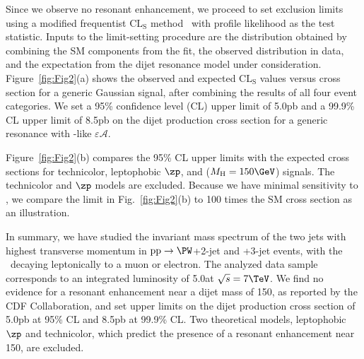 Since we observe no resonant enhancement, we proceed to set exclusion
limits using a modified frequentist $\text{CL}_{\text{S}}$
method~\cite{CLS,Junk:1999kv} with profile likelihood as the test
statistic.  Inputs to the limit-setting procedure are the \mjj
distribution obtained by combining the SM components from the fit, the
observed distribution in data, and the expectation from the dijet
resonance model under consideration.  Figure~\ref{fig:Fig2}(a) shows
the observed and expected $\text{CL}_{\text{S}}$ values versus cross
section for a generic Gaussian signal, after combining the results of
all four event categories.  We set a 95\% confidence level (CL) upper
limit of 5.0\unit{pb} and a 99.9\% CL upper limit of 8.5\unit{pb} on
the dijet production cross section for a generic resonance with
\PW\PH-like $\varepsilon\mathcal{A}$.

Figure~\ref{fig:Fig2}(b) compares the 95\% CL upper limits with the
expected cross sections for technicolor, leptophobic $\zp$, and \PW\PH
($M_{\text{H}} = 150\GeV$) signals.  The technicolor and $\zp$ models
are excluded. Because we have minimal sensitivity to \PW\PH, we compare
the limit in Fig.~\ref{fig:Fig2}(b) to 100 times the SM
cross section as an illustration.

In summary, we have studied the invariant mass spectrum of the two
jets with highest transverse momentum in
$\text{pp}\rightarrow\PW$+2-jet and \PW+3-jet events, with the \PW\
decaying leptonically to a muon or electron.  The analyzed data sample
corresponds to an integrated luminosity of 5.0\fbinv at $\sqrt{s} =
7\TeV$.  We find no evidence for a resonant enhancement near a dijet
mass of 150\GeV, as reported by the CDF Collaboration, and set upper
limits on the dijet production cross section of 5.0\unit{pb} at 95\%
CL and 8.5\unit{pb} at 99.9\% CL.  Two theoretical models, leptophobic
$\zp$ and technicolor, which predict the presence of a resonant
enhancement near 150\GeV, are excluded.

